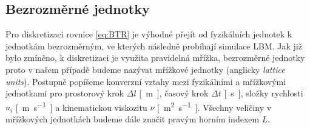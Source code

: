 \subsection{Bezrozměrné jednotky}\label{jednot}
Pro diskretizaci rovnice \eqref{eq:BTR} je výhodné přejít od fyzikálních jednotek k jednotkám bezrozměrným, ve kterých následně probíhají simulace LBM. Jak již bylo zmíněno, k diskretizaci je využita pravidelná mřížka, bezrozměrné jednotky proto v našem případě budeme nazývat mřížkové jednotky (anglicky \textit{lattice units}). Postupně popíšeme konverzní vztahy mezi fyzikálními a mřížkovými jednotkami pro prostorový krok $\Delta l$ \si{[m]}, časový krok $\Delta t$ \si{[s]}, složky rychlosti $u_{i}$ \si{[m.s^{-1}]} a kinematickou viskozitu $\nu$ \si{[m^{2}.s^{-1}]}. Všechny veličiny v mřížkových jednotkách budeme dále značit pravým horním indexem $ L $.

